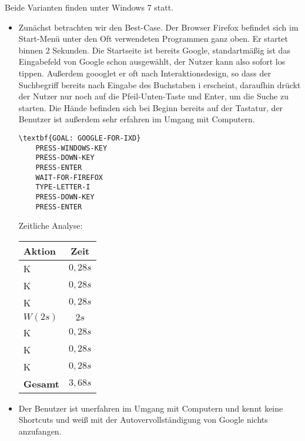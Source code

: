 \documentclass[a4paper,10pt]{article}
\begin{document}
\kopf
\renewcommand{\figurename}{Figure}


Beide Varianten finden unter Windows 7 statt.

\begin{itemize}
\item Zunächst betrachten wir den Best-Case. Der Browser Firefox befindet sich im Start-Menü unter den Oft verwendeten Programmen ganz oben. Er startet binnen 2 Sekunden. Die Startseite ist bereits Google, standartmäßig ist das Eingabefeld von Google schon ausgewählt, der Nutzer kann also sofort los tippen. Außerdem goooglet er oft nach Interaktionsdesign, so dass der Suchbegriff bereits nach Eingabe des Buchstaben i erscheint, daraufhin drückt der Nutzer nur noch auf die Pfeil-Unten-Taste und Enter, um die Suche zu starten. Die Hände befinden sich bei Beginn bereits auf der Tastatur, der Benutzer ist außerdem sehr erfahren im Umgang mit Computern.

\begin{Verbatim}[commandchars=\\\{\}]
\textbf{GOAL: GOOGLE-FOR-IXD}
    PRESS-WINDOWS-KEY
    PRESS-DOWN-KEY
    PRESS-ENTER
    WAIT-FOR-FIREFOX
    TYPE-LETTER-I
    PRESS-DOWN-KEY
    PRESS-ENTER
\end{Verbatim}

Zeitliche Analyse:
\begin{center}
    \begin{tabular}{|l|c|}
    \hline
    Aktion & Zeit \\
    \hline
    K & $0,28s$ \\
    K & $0,28s$ \\
    K & $0,28s$ \\
    $W(2s)$ & $2s$ \\
    K & $0,28s$ \\
    K & $0,28s$ \\
    K & $0,28s$ \\
    \hline
    \hline
    \textbf{Gesamt} & $3,68s$ \\
    \hline
    \end{tabular}
\end{center}

\item Der Benutzer ist unerfahren im Umgang mit Computern und kennt keine Shortcuts und weiß mit der Autovervollständigung von Google nichts anzufangen.


\end{itemize}
\end{document}
